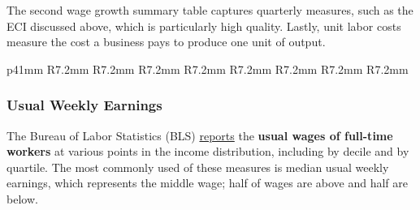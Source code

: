 \begin{minipage}{0.76\textwidth}
\small The second wage growth summary table captures quarterly measures, such as the ECI discussed above, which is particularly high quality. Lastly, unit labor costs measure the cost a business pays to produce one unit of output. 
\vspace{0.5mm}

\vspace*{-8mm}

 \setlength{\tabcolsep}{3.5pt} \color{black!90}
{\renewcommand{\arraystretch}{1.55}
\hspace{-1mm} \begin{tabular}{p{41mm} R{7.2mm} R{7.2mm} R{7.2mm} R{7.2mm} R{7.2mm}
		R{7.2mm} R{7.2mm} R{7.2mm} }
		 \hline
	\end{tabular}}
	\vspace{-1.5mm}
				
\vspace{1mm}

\subsubsection*{Usual Weekly Earnings}
\vspace*{-1mm}

\small The Bureau of Labor Statistics (BLS) \href{https://www.bls.gov/webapps/legacy/cpswktab5.htm}{reports} the \textbf{usual wages of full-time workers} at various points in the income distribution, including by decile and by quartile. The most commonly used of these measures is median usual weekly earnings, which represents the middle wage; half of wages are above and half are below.


\vspace{0.5mm}

\vspace{3.4cm}

\hspace{5mm} \vspace{0.5mm}


\end{minipage}
